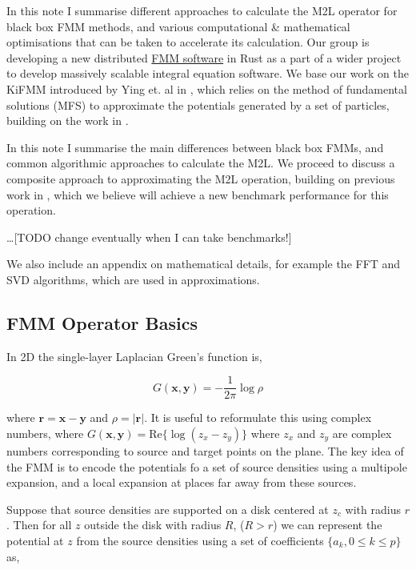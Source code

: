 \documentclass[12pt, a4, twoside]{article}
\begin{document}
In this note I summarise different approaches to calculate the M2L operator for black box FMM methods, and various computational \& mathematical optimisations that can be taken to accelerate its calculation. Our group is developing a new distributed \hyperlink{https://github.com/bempp/bempp-rs/tree/main}{FMM software} in Rust as a part of a wider project to develop massively scalable integral equation software. We base our work on the KiFMM introduced by Ying et. al in \cite{Ying2004}, which relies on the method of fundamental solutions (MFS) to approximate the potentials generated by a set of particles, building on the work in \cite{Kailasa2022}.

In this note I summarise the main differences between black box FMMs, and common algorithmic approaches to calculate the M2L. We proceed to discuss a composite approach to approximating the M2L operation, building on previous work in \cite{Malhotra2015,Messner2012}, which we believe will achieve a new benchmark performance for this operation. 

\dots [TODO change eventually when I can take benchmarks!]

We also include an appendix on mathematical details, for example the FFT and SVD algorithms, which are used in approximations.

\subsection{FMM Operator Basics}

In 2D the single-layer Laplacian Green's function is,

\begin{equation}
    G(\mathbf{x}, \mathbf{y}) = -\frac{1}{2\pi} \log \rho
\end{equation}

where $\mathbf{r} = \mathbf{x} - \mathbf{y}$ and $\rho = |\mathbf{r}|$. It is useful to reformulate this using complex numbers, where $G(\mathbf{x}, \mathbf{y}) = \text{Re}\{ \log(z_x - z_y) \}$ where $z_x$ and $z_y$ are complex numbers corresponding to source and target points on the plane. The key idea of the FMM is to encode the potentials fo a set of source densities using a multipole expansion, and a local expansion at places far away from these sources.

Suppose that source densities are supported on a disk centered at $z_c$ with radius $r$. Then for all $z$ outside the disk with radius $R$, ($R>r$) we can represent the potential at $z$ from the source densities using a set of coefficients $\{ a_k, 0 \leq k \leq p \}$ as,
\end{document}
